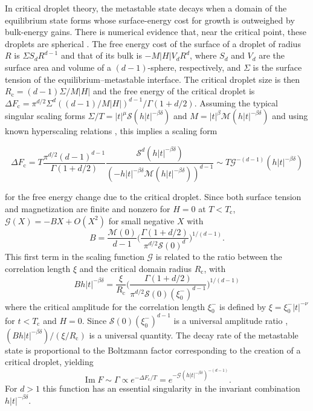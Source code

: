 \documentclass[aps,prl,reprint]{revtex4-1}
\def\[{\begin{equation}}
\def\]{\end{equation}}
\def\im{\mathop{\mathrm{Im}}\nolimits}
\def\O{O}          %
\def\c{\mathrm c}
\def\fM{\mathcal M}  %
\def\fS{\mathcal S}  %
\def\fG{\mathcal G}  %
\def\dim{d}
\newif\ifreprint
\begin{document}
In critical droplet theory, the metastable state decays when a domain of the
equilibrium state forms whose surface-energy cost for growth is outweighed by
bulk-energy gains. There is numerical evidence that, near the critical point,
these droplets are spherical \cite{gunther.1993.transfer-matrix}. The free energy
cost of the surface of a droplet of radius $R$ is $\Sigma S_\dim R^{\dim-1}$
and that of its bulk is $-M|H|V_\dim R^\dim$, where $S_\dim$ and $V_\dim$ are
the surface area and volume of a $(\dim-1)$-sphere, respectively, and $\Sigma$
is the surface tension of the equilibrium--metastable interface. The critical
droplet size is then $R_\c=(\dim-1)\Sigma/M|H|$ and the free energy of the
critical droplet is $\Delta F_\c=\pi^{\dim/2}\Sigma^\dim((\dim-1)/M|H|)^{\dim-1}/\Gamma(1+\dim/2)$.
Assuming the typical singular scaling forms
$\Sigma/T=|t|^\mu\fS(h|t|^{-\beta\delta})$ and $M=|t|^\beta\mathcal
M(h|t|^{-\beta\delta})$ and using known hyperscaling relations
\cite{widom.1981.interface}, this implies a scaling form
\def\eqcritformone{
  T\frac{\pi^{\dim/2}(\dim-1)^{\dim-1}}{\Gamma(1+\dim/2)}
    \frac{\fS^\dim(h|t|^{-\beta\delta})}{(-h|t|^{-\beta\delta}
    \fM(h|t|^{-\beta\delta}))^{\dim-1}}
}
\def\eqcritformtwo{
  T\fG^{-(\dim-1)}(h|t|^{-\beta\delta})
}
\ifreprint
\[
  \begin{aligned}
    \Delta F_\c
    &=\eqcritformone\\
    &\sim\eqcritformtwo
  \end{aligned}
\]
\else
\[
  \Delta F_\c=\eqcritformone\sim\eqcritformtwo
\]
\fi
for the free energy change due to the critical droplet.
Since both surface tension and magnetization are finite and nonzero for $H=0$
at $T<T_\c$, $\fG(X)=-BX+\O(X^2)$ for small negative $X$ with
\[
  B=\frac{\fM(0)}{\dim-1}\bigg(\frac{\Gamma(1+\dim/2)}
    {\pi^{\dim/2}\fS(0)^\dim}\bigg)^{1/(\dim-1)}.
\]
This first term in the scaling function $\fG$ is related to the ratio between
the correlation length $\xi$ and the critical domain radius $R_\c$, with
\[
  Bh|t|^{-\beta\delta}
  =\frac\xi{R_\c}\bigg(\frac{\Gamma(1+\dim/2)}
    {\pi^{\dim/2}\fS(0)(\xi_0^-)^{\dim-1}}\bigg)^{1/(\dim-1)}
\]
where the critical amplitude for the correlation length $\xi_0^-$ is defined
by $\xi=\xi_0^-|t|^{-\nu}$ for $t<T_\c$ and $H=0$. Since $\fS(0)(\xi_0^-)^{\dim-1}$ is a
universal amplitude ratio \cite{zinn.1996.universal},
$(Bh|t|^{-\beta\delta})/(\xi/R_\c)$ is a universal quantity.  The decay rate
of the metastable state is proportional to the Boltzmann factor corresponding
to the
creation of a critical droplet, yielding
\[
  \im F\sim\Gamma\propto e^{-\Delta F_\c/T}
    =e^{-\fG(h|t|^{-\beta\delta})^{-(\dim-1)}}.
\]
For $d>1$ this function has an essential singularity in the invariant
combination $h|t|^{-\beta\delta}$.
\end{document}
